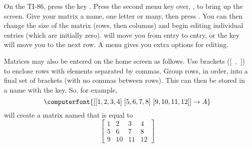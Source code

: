 On the TI-86, press the  key .  Press the second menu key over, , to bring up the  screen.  Give your matrix a name, one letter or many, then press .  You can then change the size of the matrix (rows, then columns) and begin editing individual entries (which are initially zero).   will move you from entry to entry, or the  key will move you to the next row.  A menu gives you extra options for editing.\par
%
Matrices may also be entered on the home screen as follows.  Use brackets ([~,~]) to enclose rows with elements separated by commas.  Group rows, in order, into a final set of brackets (with no commas between rows).  This can then be stored in a name with the  key.  So, for example,
%
\begin{equation*}
\computerfont{
[[1,2,3,4]\ [5,6,7,8]\ [9,10,11,12]]\rightarrow A
}
\end{equation*}
%
will create a matrix named  that is equal to
%
\begin{equation*}
%
\begin{bmatrix}
1&2&3&4\\
5&6&7&8\\
9&10&11&12
\end{bmatrix}
%
\end{equation*}